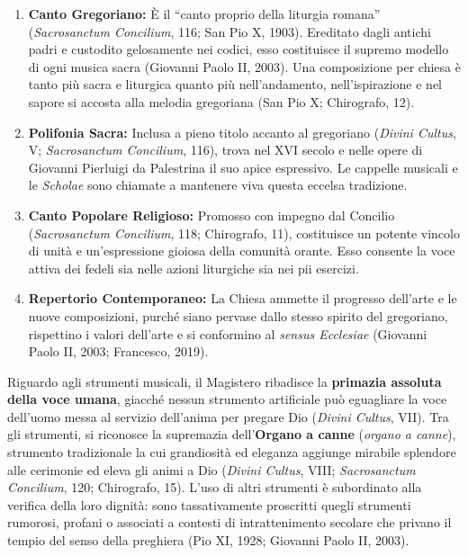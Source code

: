 \documentclass[12pt,a4paper]{article}
\begin{document}
	\begin{enumerate}[label=\arabic*.,leftmargin=*]
		\item \textbf{Canto Gregoriano:} È il ``canto proprio della liturgia romana'' (\emph{Sacrosanctum Concilium}, 116; San Pio X, 1903). Ereditato dagli antichi padri e custodito gelosamente nei codici, esso costituisce il supremo modello di ogni musica sacra (Giovanni Paolo II, 2003). Una composizione per chiesa è tanto più sacra e liturgica quanto più nell'andamento, nell'ispirazione e nel sapore si accosta alla melodia gregoriana (San Pio X; Chirografo, 12).
		\item \textbf{Polifonia Sacra:} Inclusa a pieno titolo accanto al gregoriano (\emph{Divini Cultus}, V; \emph{Sacrosanctum Concilium}, 116), trova nel XVI secolo e nelle opere di Giovanni Pierluigi da Palestrina il suo apice espressivo. Le cappelle musicali e le \emph{Scholae} sono chiamate a mantenere viva questa eccelsa tradizione.
		\item \textbf{Canto Popolare Religioso:} Promosso con impegno dal Concilio (\emph{Sacrosanctum Concilium}, 118; Chirografo, 11), costituisce un potente vincolo di unità e un'espressione gioiosa della comunità orante. Esso consente la voce attiva dei fedeli sia nelle azioni liturgiche sia nei pii esercizi.
		\item \textbf{Repertorio Contemporaneo:} La Chiesa ammette il progresso dell'arte e le nuove composizioni, purché siano pervase dallo stesso spirito del gregoriano, rispettino i valori dell'arte e si conformino al \emph{sensus Ecclesiae} (Giovanni Paolo II, 2003; Francesco, 2019).
	\end{enumerate}
	
	Riguardo agli strumenti musicali, il Magistero ribadisce la \textbf{primazia assoluta della voce umana}, giacché nessun strumento artificiale può eguagliare la voce dell'uomo messa al servizio dell'anima per pregare Dio (\emph{Divini Cultus}, VII). Tra gli strumenti, si riconosce la supremazia dell'\textbf{Organo a canne} (\emph{organo a canne}), strumento tradizionale la cui grandiosità ed eleganza aggiunge mirabile splendore alle cerimonie ed eleva gli animi a Dio (\emph{Divini Cultus}, VIII; \emph{Sacrosanctum Concilium}, 120; Chirografo, 15). L'uso di altri strumenti è subordinato alla verifica della loro dignità: sono tassativamente proscritti quegli strumenti rumorosi, profani o associati a contesti di intrattenimento secolare che privano il tempio del senso della preghiera (Pio XI, 1928; Giovanni Paolo II, 2003).
	
\end{document}
